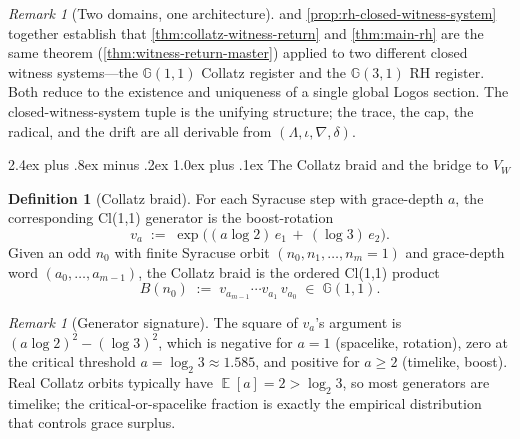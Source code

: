 \documentclass[11pt,a4paper]{article}
\makeatletter
\theoremstyle{plain}
\theoremstyle{definition}
\newtheorem{definition}[theorem]{Definition}
\theoremstyle{remark}
\newtheorem{remark}[theorem]{Remark}
\numberwithin{equation}{section}
\newcommand{\Cl}{\mathbb{G}}
\DeclareMathOperator{\E}{\mathbb{E}}
\renewcommand{\subsection}{%
  \@startsection{subsection}{2}{0pt}%
    {2.4ex plus .8ex minus .2ex}%
    {1.0ex plus .1ex}%
    {\normalfont\Large\bfseries\color{headingAccent}}%
}
\makeatother
\begin{document}
\begin{remark}[Two domains, one architecture]
\label{rmk:logos-master-applications}
 and
\cref{prop:rh-closed-witness-system} together establish that
\cref{thm:collatz-witness-return} and \cref{thm:main-rh} are
the same theorem (\cref{thm:witness-return-master}) applied to
two different closed witness systems---the $\Cl(1,1)$ Collatz
register and the $\Cl(3,1)$ RH register.  Both reduce to the
existence and uniqueness of a single global Logos section.
The closed-witness-system tuple is the unifying structure;
the trace, the cap, the radical, and the drift are all
derivable from $(\Lambda,\iota,\nabla,\delta)$.
\end{remark}

\subsection{The Collatz braid and the bridge to $V_W$}

\begin{definition}[Collatz braid]
\label{def:collatz-braid}
For each Syracuse step with grace-depth $a$, the corresponding
Cl(1,1) generator is the boost-rotation
\[
  v_a\;:=\;\exp\!\bigl((a\log 2)\,e_1\,+\,(\log 3)\,e_2\bigr).
\]
Given an odd $n_0$ with finite Syracuse orbit
$(n_0,n_1,\dots,n_m=1)$ and grace-depth word
$(a_0,\dots,a_{m-1})$, the Collatz braid is the ordered Cl(1,1)
product
\[
  B(n_0)\;:=\;v_{a_{m-1}}\cdots v_{a_1}\,v_{a_0}\;\in\;\Cl(1,1).
\]
\end{definition}

\begin{remark}[Generator signature]
\label{rmk:generator-signature}
The square of $v_a$'s argument is $(a\log 2)^2-(\log 3)^2$, which
is negative for $a=1$ (spacelike, rotation), zero at the critical
threshold $a=\log_2 3\approx1.585$, and positive for $a\ge2$
(timelike, boost).  Real Collatz orbits typically have
$\E[a]=2>\log_2 3$, so most generators are timelike;
the critical-or-spacelike fraction is exactly the empirical
distribution that controls grace surplus.
\end{remark}
\end{document}
